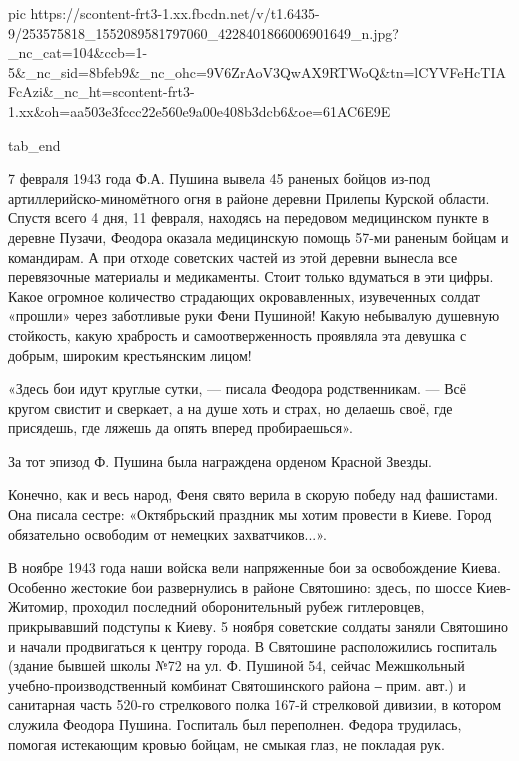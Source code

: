      pic https://scontent-frt3-1.xx.fbcdn.net/v/t1.6435-9/253575818_1552089581797060_4228401866006901649_n.jpg?_nc_cat=104&ccb=1-5&_nc_sid=8bfeb9&_nc_ohc=9V6ZrAoV3QwAX9RTWoQ&tn=lCYVFeHcTIAFcAzi&_nc_ht=scontent-frt3-1.xx&oh=aa503e3fccc22e560e9a00e408b3dcb6&oe=61AC6E9E

  tab_end
\fi

7 февраля 1943 года Ф.А. Пушина вывела 45 раненых бойцов из-под
артиллерийско-миномётного огня в районе деревни Прилепы Курской области. Спустя
всего 4 дня, 11 февраля, находясь на передовом медицинском пункте в деревне
Пузачи, Феодора оказала медицинскую помощь 57-ми раненым бойцам и командирам. А
при отходе советских частей из этой деревни вынесла все перевязочные материалы
и медикаменты. Стоит только вдуматься в эти цифры. Какое огромное количество
страдающих окровавленных, изувеченных солдат «прошли» через заботливые руки
Фени Пушиной! Какую небывалую душевную стойкость, какую храбрость и
самоотверженность проявляла эта девушка с добрым, широким крестьянским лицом!

«Здесь бои идут круглые сутки, — писала Феодора родственникам. — Всё кругом
свистит и сверкает, а на душе хоть и страх, но делаешь своё, где присядешь, где
ляжешь да опять вперед пробираешься».

За тот эпизод Ф. Пушина была награждена орденом Красной Звезды.

Конечно, как и весь народ, Феня свято верила в скорую победу над фашистами. Она
писала сестре: «Октябрьский праздник мы хотим провести в Киеве. Город
обязательно освободим от немецких захватчиков...».

В ноябре 1943 года наши войска вели напряженные бои за освобождение Киева.
Особенно жестокие бои развернулись в районе Святошино: здесь, по шоссе
Киев-Житомир, проходил последний оборонительный рубеж гитлеровцев, прикрывавший
подступы к Киеву. 5 ноября советские солдаты заняли Святошино и начали
продвигаться к центру города. В Святошине расположились госпиталь (здание
бывшей школы №72 на ул. Ф. Пушиной 54, сейчас Межшкольный
учебно-производственный комбинат Святошинского района ‒ прим. авт.) и
санитарная часть 520-го стрелкового полка 167-й стрелковой дивизии, в котором
служила Феодора Пушина. Госпиталь был переполнен. Федора трудилась, помогая
истекающим кровью бойцам, не смыкая глаз, не покладая рук.

